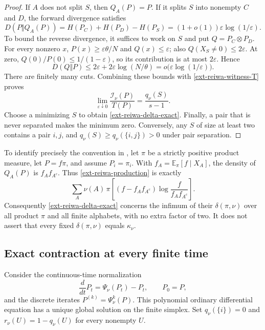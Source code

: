\documentclass[11pt,a4paper]{article}
\theoremstyle{definition}\newtheorem{definition}[theorem]{Definition}
\theoremstyle{remark}\newtheorem{remark}[theorem]{Remark}
\numberwithin{equation}{section}
\begin{document}
\begin{proof}
If $A$ does not split $S$, then $Q_A(P)=P$.  If it splits $S$ into
nonempty $C$ and $D$, the forward divergence satisfies
\[
 D(P\Vert Q_A(P))
 =H(P_C)+H(P_D)-H(P_S)
 =(1+o(1))\varepsilon\log(1/\varepsilon).
\]
To bound the reverse divergence, it suffices to work on $S$ and put
$Q=P_C\otimes P_D$.  For every nonzero $x$,
$P(x)\geq\varepsilon\theta/N$ and $Q(x)\leq\varepsilon$;
also $Q(X_S\ne0)\leq2\varepsilon$.  At zero,
$Q(0)/P(0)\leq1/(1-\varepsilon)$, so its contribution is at most
$2\varepsilon$.  Hence
\[
 D(Q\Vert P)\leq
 2\varepsilon+2\varepsilon\log(N/\theta)
 =o\bigl(\varepsilon\log(1/\varepsilon)\bigr).
\]
There are finitely many cuts.  Combining these bounds with
\eqref{ext-reiwa-witness-T} proves
\[
 \lim_{\varepsilon\downarrow0}
 \frac{\mathcal I_\nu(P)}{T(P)}
       =\frac{q_\nu(S)}{s-1}.
\]
Choose a minimizing $S$ to obtain \eqref{ext-reiwa-delta-exact}.
Finally, a pair that is never separated makes the minimum zero.
Conversely, any $S$ of size at least two contains a pair $i,j$, and
$q_\nu(S)\geq q_\nu(\{i,j\})>0$ under pair separation.
\end{proof}

To identify precisely the convention in \cite{ext-reiwa-CS}, let
$\pi$ be a strictly positive product measure, let $P=f\pi$, and
assume $P_i=\pi_i$.  With
$f_A=\mathbb E_\pi[f\mid X_A]$, the density of $Q_A(P)$ is
$f_Af_{A^c}$.  Thus \eqref{ext-reiwa-production} is exactly
\[
 \sum_A\nu(A)\,
 \pi\!\left[(f-f_Af_{A^c})
                \log\frac{f}{f_Af_{A^c}}\right].
\]
Consequently \eqref{ext-reiwa-delta-exact} concerns the infimum of their
$\delta(\pi,\nu)$ over all product $\pi$ and all finite alphabets,
with no extra factor of two.  It does not assert that every fixed
$\delta(\pi,\nu)$ equals $\kappa_\nu$.

\subsection{Exact contraction at every finite time}

Consider the continuous-time normalization
\begin{equation}\label{ext-reiwa-ode}
 \frac{d}{dt}P_t=\Psi_\nu(P_t)-P_t,\qquad P_0=P,
\end{equation}
and the discrete iterates $P^{(k)}=\Psi_\nu^k(P)$.  This polynomial
ordinary differential equation has a unique global solution on the
finite simplex.  Set $q_\nu(\{i\})=0$ and
$r_\nu(U)=1-q_\nu(U)$ for every nonempty $U$.
\end{document}
